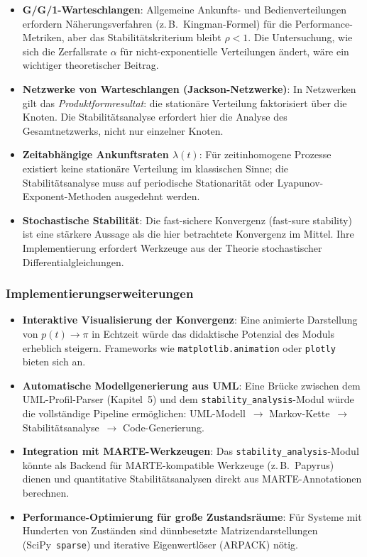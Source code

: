 ﻿\documentclass[a4paper,12pt]{scrreprt}
\theoremstyle{definition}
\begin{document}
\begin{itemize}
	\item \textbf{G/G/1-Warteschlangen}: Allgemeine Ankunfts- und
	Bedienverteilungen erfordern Näherungsverfahren (z.\,B.\ 
	Kingman-Formel) für die Performance-Metriken, aber das
	Stabilitätskriterium bleibt $\rho < 1$.  Die Untersuchung,
	wie sich die Zerfallsrate $\alpha$ für nicht-exponentielle
	Verteilungen ändert, wäre ein wichtiger theoretischer Beitrag.
	
	\item \textbf{Netzwerke von Warteschlangen (Jackson-Netzwerke)}:
	In Netzwerken gilt das \emph{Produktformresultat}: die
	stationäre Verteilung faktorisiert über die Knoten.  Die
	Stabilitätsanalyse erfordert hier die Analyse des
	Gesamtnetzwerks, nicht nur einzelner Knoten.
	
	\item \textbf{Zeitabhängige Ankunftsraten $\lambda(t)$}: Für
	zeitinhomogene Prozesse existiert keine stationäre
	Verteilung im klassischen Sinne; die Stabilitätsanalyse
	muss auf periodische Stationarität oder
	Lyapunov-Exponent-Methoden ausgedehnt werden.
	
	\item \textbf{Stochastische Stabilität}: Die fast-sichere
	Konvergenz (fast-sure stability) ist eine stärkere Aussage
	als die hier betrachtete Konvergenz im Mittel.  Ihre
	Implementierung erfordert Werkzeuge aus der Theorie
	stochastischer Differentialgleichungen.
\end{itemize}

\subsubsection{Implementierungserweiterungen}

\begin{itemize}
	\item \textbf{Interaktive Visualisierung der Konvergenz}: Eine
	animierte Darstellung von $p(t) \to \pi$ in Echtzeit würde
	das didaktische Potenzial des Moduls erheblich steigern.
	Frameworks wie \texttt{matplotlib.animation} oder
	\texttt{plotly} bieten sich an.
	
	\item \textbf{Automatische Modellgenerierung aus UML}: Eine
	Brücke zwischen dem UML-Profil-Parser (Kapitel~5) und dem
	\texttt{stability\_analysis}-Modul würde die vollständige
	Pipeline ermöglichen: UML-Modell~$\to$ Markov-Kette~$\to$
	Stabilitätsanalyse~$\to$ Code-Generierung.
	
	\item \textbf{Integration mit MARTE-Werkzeugen}: Das
	\texttt{stability\_analysis}-Modul könnte als Backend für
	MARTE-kompatible Werkzeuge (z.\,B.\ Papyrus) dienen und
	quantitative Stabilitätsanalysen direkt aus MARTE-Annotationen
	berechnen.
	
	\item \textbf{Performance-Optimierung für große Zustandsräume}:
	Für Systeme mit Hunderten von Zuständen sind dünnbesetzte
	Matrizendarstellungen (SciPy~\texttt{sparse}) und
	iterative Eigenwertlöser (ARPACK) nötig.
\end{itemize}
\end{document}
